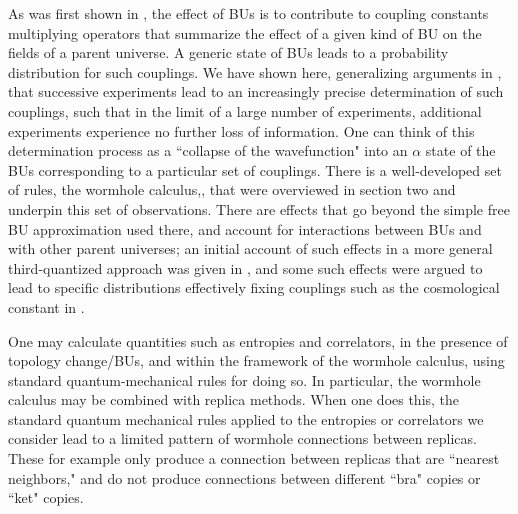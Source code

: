 \documentclass[11pt]{article}
\numberwithin{equation}{section}
\begin{document}
As was first shown in \cite{Cole,GiStInc}, the effect of BUs is to contribute to coupling constants multiplying  operators that summarize the effect of a given kind of BU on the fields of a parent universe.  A generic state of BUs leads to a probability distribution for such couplings. We have shown here, generalizing arguments in \cite{Cole,GiStInc}, that successive experiments lead to an increasingly precise determination of such couplings, such that in the limit of a large number of experiments, additional experiments experience no further loss of information.  One can think of this determination process as a ``collapse of the wavefunction" into an $\alpha$ state of the BUs corresponding to a particular set of couplings.  There is a well-developed set of rules, the wormhole calculus,\cite{GiStInc},\cite{Cole} that were overviewed in section two and underpin this set of observations.  There are effects that go beyond the simple free BU approximation used there, and account for interactions between BUs and with other parent universes; an initial account of such effects in a more general third-quantized approach was given in \cite{GiSt3Q}, and some such effects were argued to lead to specific distributions effectively fixing couplings such as the cosmological constant in \cite{ColeCC}.

One may calculate quantities such as entropies and correlators, in the presence of topology change/BUs, and within the framework of the wormhole calculus, using standard quantum-mechanical rules for doing so.  In particular, the wormhole calculus may be combined with replica methods\cite{CaWi}.
When one does this, the standard quantum mechanical rules applied to the entropies or correlators we consider
lead to a limited pattern of wormhole connections between replicas.  These for example only produce a connection between replicas that are ``nearest neighbors," and do not produce connections between different ``bra" copies or ``ket" copies.
\end{document}
